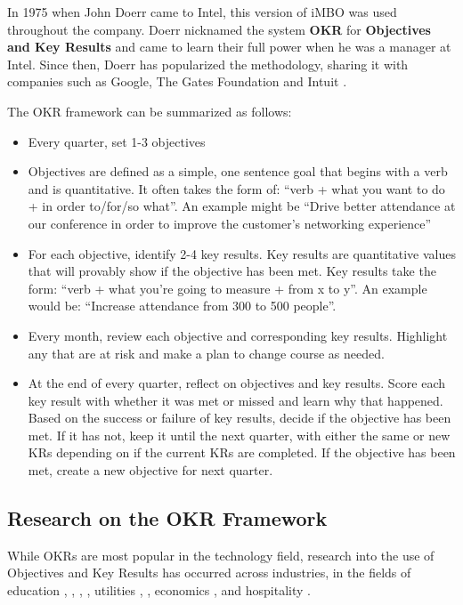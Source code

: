 \documentclass[sigconf, nonacm]{acmart}
\begin{document}
In 1975 when John Doerr came to Intel, this version of iMBO was used throughout the company. Doerr nicknamed the system \textbf{OKR} for \textbf{Objectives and Key Results} and came to learn their full power when he was a manager at Intel. Since then, Doerr has popularized the methodology, sharing it with companies such as Google, The Gates Foundation and Intuit \cite{Doerr01}.

The OKR framework can be summarized as follows:
\begin{itemize}
    \item{Every quarter, set 1-3 objectives}
    \item{Objectives are defined as a simple, one sentence goal that begins with a verb and is quantitative. It often takes the form of: ``verb + what you want to do + in order to/for/so what''. An example might be ``Drive better attendance at our conference in order to improve the customer's networking experience''}
    \item{For each objective, identify 2-4 key results. Key results are quantitative values that will provably show if the objective has been met. Key results take the form: ``verb + what you're going to measure + from x to y''. An example would be: ``Increase attendance from 300 to 500 people''.}
    \item{Every month, review each objective and corresponding key results. Highlight any that are at risk and make a plan to change course as needed.}
    \item{At the end of every quarter, reflect on objectives and key results. Score each key result with whether it was met or missed and learn why that happened. Based on the success or failure of key results, decide if the objective has been met. If it has not, keep it until the next quarter, with either the same or new KRs depending on if the current KRs are completed. If the objective has been met, create a new objective for next quarter.}
\end{itemize}

\subsection{Research on the OKR Framework}
While OKRs are most popular in the technology field, research into the use of Objectives and Key Results has occurred across industries, in the fields of education \cite{mangipudi}, \cite{fonseca}, \cite{ruixia}, \cite{rao}, utilities \cite{charo}, \cite{trink}, economics \cite{businessSchool}, and hospitality \cite{pureheart}.
\end{document}
